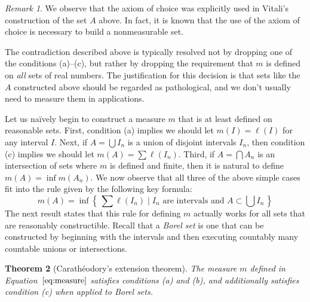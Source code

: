 \documentclass[11pt,oneside,a4paper]{amsbook}
\newcommand{\set}[1]{\left\{\,#1\,\right\}}
\theoremstyle{definition}
\theoremstyle{plain}
\newtheorem{theorem}{Theorem}[section]
\theoremstyle{definition}
\theoremstyle{remark}
\newtheorem{remark}[theorem]{Remark}
\numberwithin{equation}{section}
\numberwithin{figure}{section}
\begin{document}
\begin{remark}
  We observe that the axiom of choice was explicitly used in Vitali's construction of the set $A$ above. In fact, it is known that the use of the axiom of choice is necessary to build a nonmeasurable set.
\end{remark}

The contradiction described above is typically resolved not by dropping one of the conditions (a)--(c), but rather by dropping the requirement that $m$ is defined on \emph{all} sets of real numbers. The justification for this decision is that sets like the $A$ constructed above should be regarded as pathological, and we don't usually need to measure them in applications.

Let us na\"ively begin to construct a measure $m$ that is at least defined on reasonable sets. First, condition (a) implies we should let $m(I)=\ell(I)$ for any interval $I$. Next, if $A=\bigcup I_n$ is a union of disjoint intervals $I_n$, then condition (c) implies we should let $m(A)=\sum\ell(I_n)$. Third, if $A=\bigcap A_n$ is an intersection of sets where $m$ is defined and finite, then it is natural to define $m(A)=\inf m(A_n)$. We now observe that all three of the above simple cases fit into the rule given by the following key formula:
\begin{equation}
  \label{eq:measure}
  m(A)=\inf\set{\sum\ell(I_n)\mid \text{$I_n$ are intervals and }A\subset\bigcup I_n}
\end{equation}
The next result states that this rule for defining $m$ actually works for all sets that are reasonably constructible. Recall that a \emph{Borel set} is one that can be constructed by beginning with the intervals and then executing countably many countable unions or intersections.

\begin{theorem}[Carath\'eodory's extension theorem]
  \label{thm:caratheodory}
  The measure $m$ defined in Equation~$\eqref{eq:measure}$ satisfies conditions (a) and (b), and additionally satisfies condition (c) when applied to Borel sets.
\end{theorem}
\end{document}
